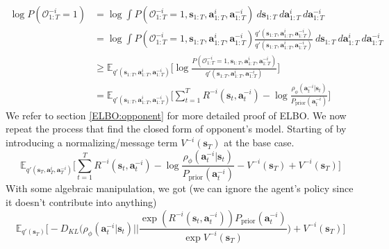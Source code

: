 \begin{equation}
    \label{equation:18}
    \begin{aligned}
        \log P(\mathcal{O}^{-i}_{1:T} = 1) &= \log \int P(\mathcal{O}^{-i}_{1:T} = 1, \boldsymbol{s}_{1:T}, \boldsymbol{a}^i_{1:T}, \boldsymbol{a}^{-i}_{1:T}) \ d\boldsymbol{s}_{1:T} \ d\boldsymbol{a}^i_{1:T} \ d\boldsymbol{a}^{-i}_{1:T} \\ 
        &= \log \int P(\mathcal{O}^{-i}_{1:T} = 1, \boldsymbol{s}_{1:T}, \boldsymbol{a}^i_{1:T}, \boldsymbol{a}^{-i}_{1:T}) \frac{q'(\boldsymbol{s}_{1:T}, \boldsymbol{a}^i_{1:T}, \boldsymbol{a}^{-i}_{1:T})}{q'(\boldsymbol{s}_{1:T}, \boldsymbol{a}^i_{1:T}, \boldsymbol{a}^{-i}_{1:T})} \ d\boldsymbol{s}_{1:T} \ d\boldsymbol{a}^i_{1:T} \ d\boldsymbol{a}^{-i}_{1:T} \\
        &\ge \mathbb{E}_{q'(\boldsymbol{s}_{1:T}, \boldsymbol{a}^i_{1:T}, \boldsymbol{a}^{-i}_{1:T})}\Bigg[ \log \frac{P(\mathcal{O}^{-i}_{1:T} = 1, \boldsymbol{s}_{1:T}, \boldsymbol{a}^i_{1:T}, \boldsymbol{a}^{-i}_{1:T})}{q'(\boldsymbol{s}_{1:T}, \boldsymbol{a}^i_{1:T}, \boldsymbol{a}^{-i}_{1:T})} \Bigg] \\
        &= \mathbb{E}_{q'(\boldsymbol{s}_{1:T}, \boldsymbol{a}^i_{1:T}, \boldsymbol{a}^{-i}_{1:T})}\Bigg[\sum^{T}_{t=1}  R^{-i}(\boldsymbol{s}_{t}, \boldsymbol{a}^{-i}_{t}) - \log \frac{\rho_{\phi}(\boldsymbol{a}^{-i}_t | \boldsymbol{s}_t)}{P_{\text{prior}}(\boldsymbol{a}^{-i}_t)}\Bigg]
    \end{aligned}
\end{equation}
We refer to section \ref{ELBO:opponent} for more detailed proof of ELBO.
We now repeat the process that find the closed form of opponent's model. Starting of by introducing a normalizing/message term $V^{-i}(\boldsymbol{s}_T)$ at the base case. 
\begin{equation}
    \mathbb{E}_{q'(\boldsymbol{s}_{T}, \boldsymbol{a}^i_{T}, \boldsymbol{a}^{-i}_{T})}\Bigg[\sum^{T}_{t=1}  R^{-i}(\boldsymbol{s}_{t}, \boldsymbol{a}^{-i}_{t}) - \log \frac{\rho_{\phi}(\boldsymbol{a}^{-i}_t | \boldsymbol{s}_t)}{P_{\text{prior}}(\boldsymbol{a}^{-i}_t)} - V^{-i}(\boldsymbol{s}_T) + V^{-i}(\boldsymbol{s}_T)\Bigg]
\end{equation}
With some algebraic manipulation, we got (we can ignore the agent's policy since it doesn't contribute into anything)
\begin{equation}
    \mathbb{E}_{q'(\boldsymbol{s}_{T})} \Bigg[ -D_{KL}\Bigg( \rho_{\phi}(\boldsymbol{a}^{-i}_t | \boldsymbol{s}_t) \Bigg|\Bigg| \frac{\exp\left(R^{-i}(\boldsymbol{s}_{t}, \boldsymbol{a}^{-i}_{t})\right)P_{\text{prior}}(\boldsymbol{a}^{-i}_t)}{\exp V^{-i}(\boldsymbol{s}_T)} \Bigg) + V^{-i}(\boldsymbol{s}_T) \Bigg]
\end{equation}
